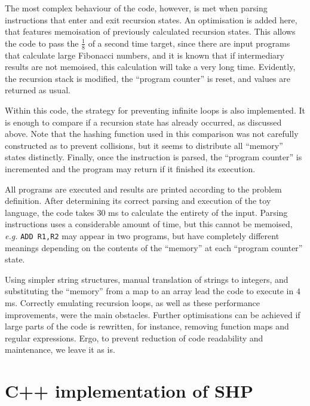 \documentclass[12pt]{article}
\begin{document}
The most complex behaviour of the code, however, is met when parsing
instructions that enter and exit recursion states. An optimisation is added
here, that features memoisation of previously calculated recursion states. This
allows the code to pass the $\frac{1}{8}$ of a second time target, since there
are input programs that calculate large Fibonacci numbers, and it is known that
if intermediary results are not memoised, this calculation will take a very
long time. Evidently, the recursion stack is modified, the ``program counter''
is reset, and values are returned as usual.

Within this code, the strategy for preventing infinite loops is also
implemented. It is enough to compare if a recursion state has already occurred,
as discussed above. Note that the hashing function used in this comparison was
not carefully constructed as to prevent collisions, but it seems to distribute
all ``memory'' states distinctly. Finally, once the instruction is parsed, the
``program counter'' is incremented and the program may return if it finished
its execution.

All programs are executed and results are printed according to the problem
definition. After determining its correct parsing and execution of the toy
language, the code takes $30$ ms to calculate the entirety of the input.
Parsing instructions uses a considerable amount of time, but this cannot be
memoised, \emph{e.g.} \texttt{ADD R1,R2} may appear in two programs, but have
completely different meanings depending on the contents of the ``memory'' at
each ``program counter'' state.

Using simpler string structures, manual translation of strings to integers, and
substituting the ``memory'' from a map to an array lead the code to execute in
$4$ ms. Correctly emulating recursion loops, as well as these performance
improvements, were the main obstacles. Further optimisations can be achieved if
large parts of the code is rewritten, for instance, removing function maps and
regular expressions. Ergo, to prevent reduction of code readability and
maintenance, we leave it as is.




\appendix

\section{C++ implementation of SHP}\label{app:impl}

\end{document}
